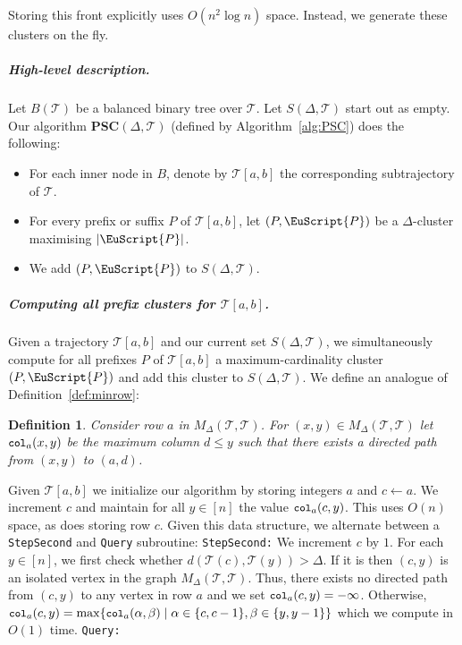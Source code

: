 \documentclass[11pt]{article}
\newcommand{\fancy}[1]{\EuScript{#1}}
\newcommand{\maxcol}{\texttt{\small col}}
\newcommand{\pathlet}{cluster\xspace}
\newcommand{\pathlets}{clusters\xspace}
\newtheorem{definition}{Definition}
\begin{document}
Storing this front explicitly uses $O(n^2 \log n)$ space. Instead, we generate these clusters on the fly.  
%
\subparagraph{High-level description.}
Let $B(\mathcal{T})$ be a balanced binary tree over $\mathcal{T}$.
Let $S(\Delta, \mathcal{T})$ start out as empty. Our algorithm \textbf{PSC}$(\Delta, \mathcal{T})$  (defined by Algorithm~\ref{alg:PSC}) does the following: 
%
%
\begin{itemize}
    \item For each inner node in $B$, denote by  $\mathcal{T}[a, b]$ the corresponding subtrajectory of $\mathcal{T}$.
    \item For every prefix or suffix $P$ of $\mathcal{T}[a, b]$, let  $(P, {\fancy{P}})$ be a $\Delta$-\pathlet  maximising $|{\fancy{P}}|$.  
    \item We add $(P, {\fancy{P}})$ to $S(\Delta, \mathcal{T})$.
\end{itemize}
%
%
\subparagraph{Computing all prefix \pathlets for $\mathcal{T}[a, b]$.}
Given a trajectory $\mathcal{T}[a, b]$ and our current set $S(\Delta, \mathcal{T})$, we simultaneously compute for all prefixes $P$ of $\mathcal{T}[a, b]$ a maximum-cardinality \pathlet $(P, {\fancy{P}})$ and add this \pathlet to $S(\Delta, \mathcal{T})$.
We define an analogue of Definition~\ref{def:minrow}: 
%
%
\begin{definition}
Consider row $a$ in $M_\Delta(\mathcal{T}, \mathcal{T})$. 
    For $(x, y) \in M_\Delta(\mathcal{T}, \mathcal{T})$ let $\maxcol_a(x, y)$ be the maximum column $d \leq y$ such that there exists a directed path from $(x, y)$ to $(a, d)$.
\end{definition}
%
%
\noindent
Given $\mathcal{T}[a,b]$ we initialize our algorithm by storing integers $a$ and $c \gets a$. 
We increment $c$ and maintain for all $y \in [n]$ the value $\maxcol_a(c, y)$. This uses $O(n)$ space, as does storing row $c$. 
Given this data structure, we alternate between a \texttt{StepSecond} and \texttt{Query} subroutine:
%
  \vspace{0.5cm}
\texttt{StepSecond:} We increment $c$ by $1$. 
For each $y \in [n]$, we first check whether $d(\mathcal{T}(c), \mathcal{T}(y)) > \Delta$.
If it is then $(c, y)$ is an isolated vertex in the graph $M_\Delta(\mathcal{T}, \mathcal{T})$. Thus, there exists no directed path from $(c, y)$ to any vertex in row $a$ and we set $\maxcol_a(c, y) = - \infty$. 
Otherwise, $\maxcol_a(c, y) = \max \{ \maxcol_a(\alpha, \beta) \mid  \alpha \in \{ c, c - 1 \}, \beta \in \{ y, y - 1 \}   \}$ which we compute in $O(1)$ time. 
%
\texttt{Query:}
\end{document}
